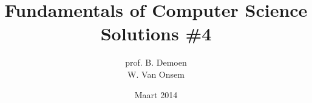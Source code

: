 \documentclass{article}
\title{Fundamentals of Computer Science\\Solutions \#4}
\author{prof. B. Demoen\\W. Van Onsem}
\date{Maart 2014}
\begin{document}
\maketitle
\begin{exercise}
\end{exercise}
\end{document}
